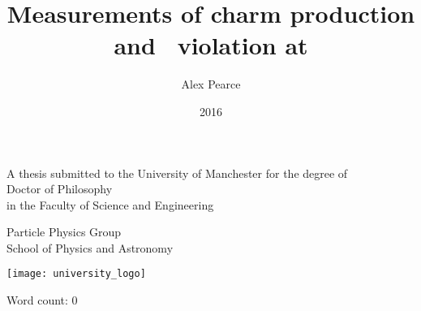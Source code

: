\documentclass[a4paper,11pt]{memoir}
\author{Alex Pearce}
\title{%
  Measurements of charm production and
  \texorpdfstring{\CP}{CP}\ violation at \lhcb
}
\date{2016}
\begin{document}
\begin{titlingpage}
  \begin{center}
    \textbf{\huge\thetitle}

    \vfill

    A thesis submitted to the University of Manchester for the degree of\\
    Doctor of Philosophy\\
    in the Faculty of Science and Engineering\\

    \vspace{0.8cm}

    \textbf{\thedate}

    \vfill

    \textbf{\theauthor}

    \vspace{0.8cm}

    Particle Physics Group\\
    School of Physics and Astronomy\\

    \vspace{0.8cm}

    \texttt{[image: university\_logo]}

    \iftoggle{draft}{%
      \vspace{0.8cm}
      \texttt{Draft generated on \today}
    }{}
  \end{center}
\end{titlingpage}

\frontmatter

\tableofcontents*

\vspace{1cm}
\noindent
Word count: 0

\cleardoublepage



\cleardoublepage



\cleardoublepage



\cleardoublepage



\cleardoublepage


\end{document}

